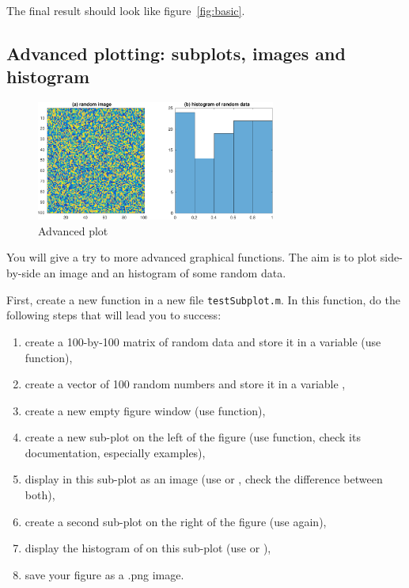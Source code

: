 \documentclass{article}
\begin{document}
The final result should look like figure~\ref{fig:basic}.

\subsection{Advanced plotting: subplots, images and histogram}

\begin{figure}
  \centering
  \includegraphics[width=0.7\textwidth]{advancedplot.pdf}
  \caption{Advanced plot}\label{fig:adv}
\end{figure}

You will give a try to more advanced graphical functions.
The aim is to plot side-by-side an image and an histogram of some random data.

First, create a new function  in a new file \verb|testSubplot.m|.
In this function, do the following steps that will lead you to success:
\begin{enumerate}
  \item create a 100-by-100 matrix of random data and store it in a variable  (use  function),
  \item create a vector of 100 random numbers and store it in a variable ,
  \item create a new empty figure window (use  function),
  \item create a new sub-plot on the left of the figure (use  function, check its documentation, especially examples),
  \item display in this sub-plot  as an image (use  or , check the difference between both),
  \item create a second sub-plot on the right of the figure (use  again),
  \item display the histogram of  on this sub-plot (use  or ),
  \item save your figure as a .png image.
\end{enumerate}
\end{document}
